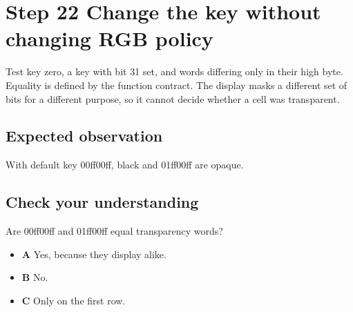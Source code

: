 \section{Step 22 Change the key without changing RGB policy}\label{blit-s22}

Test key zero, a key with bit 31 set, and words differing only in their high byte. Equality is defined by the function contract. The display masks a different set of bits for a different purpose, so it cannot decide whether a cell was transparent.


\subsection{Expected observation}
With default key 00ff00ff, black and 01ff00ff are opaque.

\subsection{Check your understanding}
Are 00ff00ff and 01ff00ff equal transparency words?

\begin{itemize}
  \item \textbf{A} Yes, because they display alike.
  \item \textbf{B} No.
  \item \textbf{C} Only on the first row.
\end{itemize}
